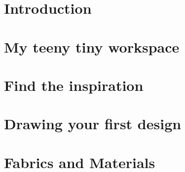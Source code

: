 \chapter{Introduction} \label{chap:intro}


\chapter{My teeny tiny workspace} \label{chap:workspace}


\chapter{Find the inspiration} \label{chap:inspiration}


\chapter{Drawing your first design} \label{chap:design}


\chapter{Fabrics and Materials} \label{chap:materials}


